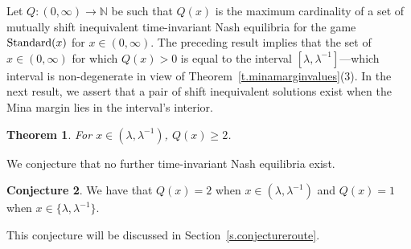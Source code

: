\documentclass[letterpaper,11pt,oneside,reqno]{amsbook}
\newcommand{\N}{\ensuremath{\mathbb{N}}}
\newtheorem{theorem}{Theorem}[chapter]
\numberwithin{figure}{chapter}
\theoremstyle{definition}
\theoremstyle{definition}
\theoremstyle{definition}
\theoremstyle{definition}
\theoremstyle{definition}
\newtheorem{conjecture}[theorem]{Conjecture}
\newcommand{\standard}{{\rm Standard}}
\begin{document}
Let $Q:(0,\infty) \to \N$ be such that $Q(x)$ is the maximum cardinality of a set of mutually shift inequivalent time-invariant Nash equilibria for the game $\standard(x)$ for $x \in (0,\infty)$.
 The preceding result implies that the set of $x \in (0,\infty)$ for which $Q(x) > 0$ is equal to the interval $[\lambda,\lambda^{-1}]$---which interval is non-degenerate in view of Theorem~\ref{t.minamarginvalues}(3). In the next result, we assert that a pair of shift inequivalent solutions exist when the Mina margin lies in the interval's interior.
\begin{theorem}\label{t.solutions}
For $x \in (\lambda,\lambda^{-1})$, $Q(x) \geq 2$.
\end{theorem}
We conjecture that no further time-invariant Nash equilibria exist.
\begin{conjecture}\label{c.solutions}
We have that $Q(x) = 2$ when $x \in (\lambda,\lambda^{-1})$ and $Q(x) =1$ when $x \in \{ \lambda,\lambda^{-1} \big\}$.
\end{conjecture}
This conjecture will be discussed in Section~\ref{s.conjectureroute}.
\end{document}

